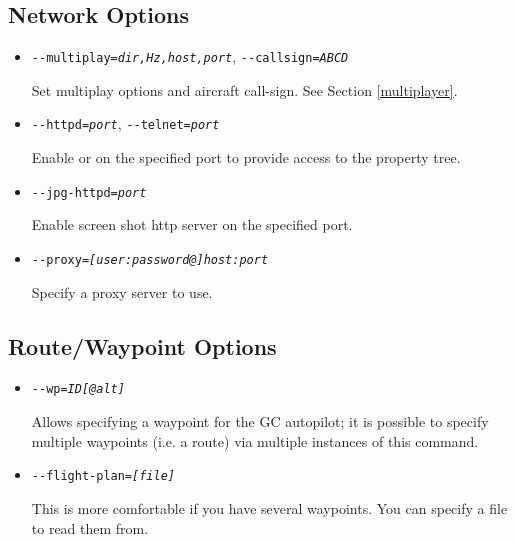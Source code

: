 \subsection{Network Options}
\begin{itemize}
\item{\texttt{-$ $-multiplay={\it dir,Hz,host,port}}, \texttt{-$ $-callsign={\it ABCD}}}

Set multiplay options and aircraft call-sign. See Section \ref{multiplayer}.

\item{\texttt{-$ $-httpd={\it port}}, \texttt{-$ $-telnet={\it port}}}

Enable  or  on the specified port to provide
access to the property tree.

\item{\texttt{-$ $-jpg-httpd={\it port}}}

Enable screen shot http server on the specified port.

\item{\texttt{-$ $-proxy={\it [user:password@]host:port}}}

Specify a proxy server to use.

\end{itemize}
\subsection{Route/Waypoint Options}
\begin{itemize}
\item{\texttt{-$ $-wp={\it ID[@alt]}}}

  Allows specifying a waypoint for the GC autopilot; it is possible to
  specify multiple waypoints (i.e. a route) via multiple instances of
  this command.

\item{\texttt{-$ $-flight-plan={\it [file]}}}

  This is more comfortable if you have several waypoints. You can
  specify a file to read them from.
\end{itemize}

